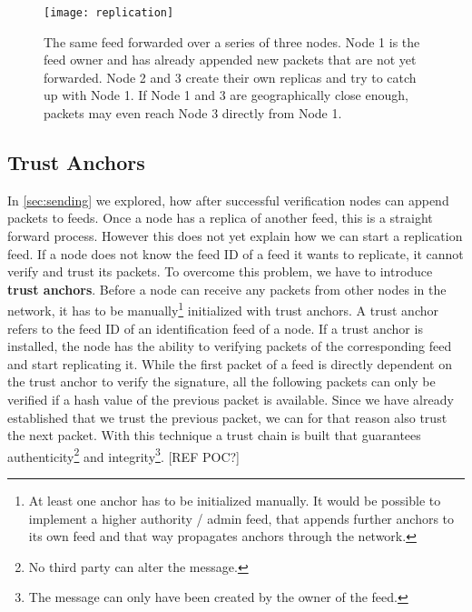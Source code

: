 \begin{figure}
\centering
\texttt{[image: replication]}
\caption{The same feed forwarded over a series of three nodes. Node 1 is the feed owner and has already appended new packets that are not yet forwarded. Node 2 and 3 create their own replicas and try to catch up with Node 1. If Node 1 and 3 are geographically close enough, packets may even reach Node 3 directly from Node 1.}
\label{fig:replication}
\end{figure}

\subsection{Trust Anchors}
\label{sec:anchor}
In \cref{sec:sending} we explored, how after successful verification nodes can append packets to feeds. Once a node has a replica of another feed, this is a straight forward process. However this does not yet explain how we can start a replication feed. If a node does not know the feed ID of a feed it wants to replicate, it cannot verify and trust its packets. To overcome this problem, we have to introduce \textbf{trust anchors}. Before a node can receive any packets from other nodes in the network, it has to be manually\footnote{At least one anchor has to be initialized manually. It would be possible to implement a higher authority / admin feed, that appends further anchors to its own feed and that way propagates anchors through the network.} initialized with trust anchors. A trust anchor refers to the feed ID of an identification feed of a node. If a trust anchor is installed, the node has the ability to verifying packets of the corresponding feed and start replicating it. While the first packet of a feed is directly dependent on the trust anchor to verify the signature, all the following packets can only be verified if a hash value of the previous packet is available. Since we have already established that we trust the previous packet, we can for that reason also trust the next packet. With this technique a trust chain is built that guarantees authenticity\footnote{No third party can alter the message.} and integrity\footnote{The message can only have been created by the owner of the feed.}. [REF POC?]


